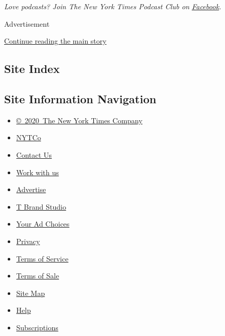 \emph{Love podcasts? Join The New York Times Podcast Club on}
\href{https://www.facebook.com/groups/nytpodcastclub}{\emph{Facebook}}\emph{.}

Advertisement

\protect\hyperlink{after-bottom}{Continue reading the main story}

\hypertarget{site-index}{%
\subsection{Site Index}\label{site-index}}

\hypertarget{site-information-navigation}{%
\subsection{Site Information
Navigation}\label{site-information-navigation}}

\begin{itemize}
\tightlist
\item
  \href{https://help.nytimes.com/hc/en-us/articles/115014792127-Copyright-notice}{©~2020~The
  New York Times Company}
\end{itemize}

\begin{itemize}
\tightlist
\item
  \href{https://www.nytco.com/}{NYTCo}
\item
  \href{https://help.nytimes.com/hc/en-us/articles/115015385887-Contact-Us}{Contact
  Us}
\item
  \href{https://www.nytco.com/careers/}{Work with us}
\item
  \href{https://nytmediakit.com/}{Advertise}
\item
  \href{http://www.tbrandstudio.com/}{T Brand Studio}
\item
  \href{https://www.nytimes.com/privacy/cookie-policy\#how-do-i-manage-trackers}{Your
  Ad Choices}
\item
  \href{https://www.nytimes.com/privacy}{Privacy}
\item
  \href{https://help.nytimes.com/hc/en-us/articles/115014893428-Terms-of-service}{Terms
  of Service}
\item
  \href{https://help.nytimes.com/hc/en-us/articles/115014893968-Terms-of-sale}{Terms
  of Sale}
\item
  \href{https://spiderbites.nytimes.com}{Site Map}
\item
  \href{https://help.nytimes.com/hc/en-us}{Help}
\item
  \href{https://www.nytimes.com/subscription?campaignId=37WXW}{Subscriptions}
\end{itemize}
